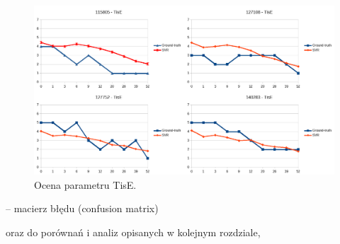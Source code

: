 \begin{figure}[h]
	\centering
	\includegraphics[width=1\textwidth]{figures/TisE.png}
	\caption{Ocena parametru TisE.}\label{fig:TisE}
\end{figure}

-- macierz błędu (confusion matrix)

oraz do porównań i analiz opisanych w kolejnym rozdziale,